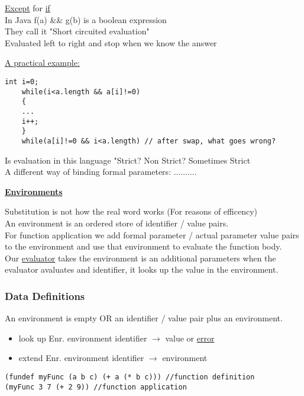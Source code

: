 \documentclass{article}
\begin{document}
\begin{flushleft}
\underline{Except} for \underline{if}\\
In Java f(a) \&\& g(b) is a boolean expression\\
They call it "Short circuited evaluation"\\
\color{red}Evaluated left to right and stop when we know the answer
\end{flushleft}

\doublespacing
\begin{flushleft}
\underline{A practical example:}
\end{flushleft}

\begin{verbatim}
int i=0;
	while(i<a.length && a[i]!=0)
	{
	...
	i++;
	}
	while(a[i]!=0 && i<a.length) // after swap, what goes wrong?
\end{verbatim}

\begin{flushleft}
Is evaluation in this language "Strict? Non Strict? Sometimes Strict\\
A different way of binding formal parameters: ..........
\end{flushleft}
\begin{center}
\textbf{\underline{Environments}}
\end{center}

\begin{flushleft}
Substitution is not how the real word works (For reasons of efficency)\\
An environment is an ordered store of identifier / value pairs.\\
For function application we add formal parameter / actual parameter value pairs to the environment and use that environment to evaluate the function body.\\
Our \underline{evaluator} takes the environment is an additional parameters when the evaluator avaluates and identifier, it looks up the value in the environment.
\end{flushleft}

\subsubsection*{Data Definitions}
An environment is empty OR an identifier / value pair plus an environment.
\begin{itemize}
\item look up Enr. environment identifier $\rightarrow$ value or \underline{error}
\item extend Enr. environment identifier $\rightarrow$ environment
\end{itemize}
\begin{verbatim}
(fundef myFunc (a b c) (+ a (* b c))) //function definition
(myFunc 3 7 (+ 2 9)) //function application
\end{verbatim}
\end{document}
